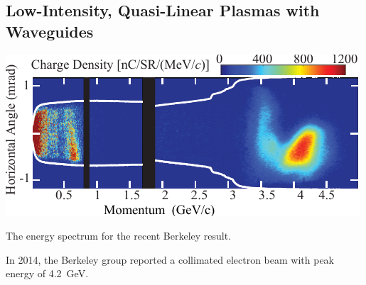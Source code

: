 \documentclass[12pt,letter]{article}
\begin{document}
\subsection{Low-Intensity, Quasi-Linear Plasmas with Waveguides}

\begin{marginfigure}
    \includegraphics[width=\marginparwidth]{../figures/esaenergy.pdf}
    \caption{The energy spectrum for the recent Berkeley result.}
\end{marginfigure}


In 2014, the Berkeley group reported a collimated electron beam with peak
energy of \SI{4.2}{\giga \electronvolt}.
\end{document}
